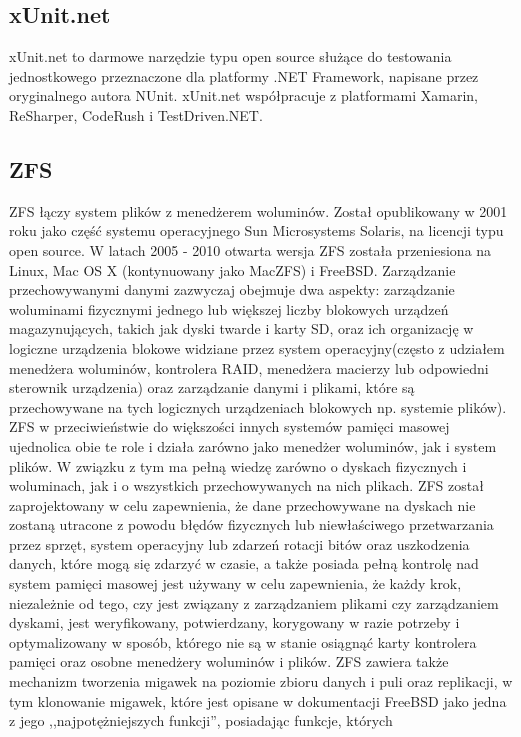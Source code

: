 \documentclass[12pt,a4paper]{article}
\begin{document}
		\subsection{xUnit.net}
			\indent xUnit.net to darmowe narzędzie typu open source służące do testowania jednostkowego
			przeznaczone dla platformy .NET Framework, napisane przez oryginalnego autora NUnit.
			xUnit.net współpracuje z platformami Xamarin, ReSharper, CodeRush i TestDriven.NET.
		
		\subsection{ZFS}
		\indent ZFS łączy system plików z menedżerem woluminów. Został opublikowany w 2001 roku jako część systemu operacyjnego Sun Microsystems Solaris, na licencji typu open source.
			W latach 2005 - 2010 otwarta wersja ZFS została przeniesiona na Linux, Mac OS X (kontynuowany jako MacZFS) i FreeBSD.
			Zarządzanie przechowywanymi danymi zazwyczaj obejmuje dwa aspekty: zarządzanie woluminami fizycznymi jednego lub większej liczby blokowych urządzeń magazynujących, takich jak dyski
			twarde i karty SD, oraz ich organizację w logiczne urządzenia blokowe widziane przez system operacyjny(często z udziałem menedżera woluminów, kontrolera RAID, menedżera macierzy
			lub odpowiedni sterownik urządzenia) oraz zarządzanie danymi i plikami, które są przechowywane na tych logicznych urządzeniach blokowych np. systemie plików). ZFS w
			przeciwieństwie do większości innych systemów pamięci masowej ujednolica obie te role i działa zarówno jako menedżer woluminów, jak i system plików. W związku
			z tym ma pełną wiedzę zarówno o dyskach fizycznych i woluminach, jak i o wszystkich przechowywanych na nich plikach. ZFS został zaprojektowany w celu zapewnienia, że dane
			przechowywane na dyskach nie zostaną utracone z powodu błędów fizycznych lub niewłaściwego przetwarzania przez sprzęt, system operacyjny lub zdarzeń rotacji bitów oraz uszkodzenia
			danych, które mogą się zdarzyć w czasie, a także posiada pełną kontrolę nad system pamięci masowej jest używany w celu zapewnienia, że każdy krok, niezależnie od tego,
			czy jest związany z zarządzaniem plikami czy zarządzaniem dyskami, jest weryfikowany, potwierdzany, korygowany w razie potrzeby i optymalizowany w sposób, którego nie są
			w stanie osiągnąć karty kontrolera pamięci oraz osobne menedżery woluminów i plików. ZFS zawiera także mechanizm tworzenia migawek na poziomie zbioru danych i puli oraz
			replikacji, w tym klonowanie migawek, które jest opisane w dokumentacji FreeBSD jako jedna z jego ,,najpotężniejszych funkcji'', posiadając funkcje, których
\end{document}
